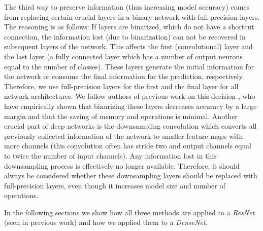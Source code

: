 \documentclass[10pt,twocolumn,letterpaper]{article}
\newcommand{\arch}[1]{\emph{#1}}
\begin{document}
The third way to preserve information (thus increasing model accuracy) comes from replacing certain crucial layers in a binary network with full precision layers.
The reasoning is as follows:
If layers are binarized, which do not have a shortcut connection, the information lost (due to binarization) can not be recovered in subsequent layers of the network.
This affects the first (convolutional) layer and the last layer (a fully connected layer which has a number of output neurons equal to the number of classes).
These layers generate the initial information for the network or consume the final information for the prediction, respectively.
Therefore, we use full-precision layers for the first and the final layer for all network architectures.
We follow authors of previous work on this decision \cite{Rastegari2016,Zhou2016}, who have empirically shown that binarizing these layers decreases accuracy by a large margin and that the saving of memory and operations is minimal.
Another crucial part of deep networks is the downsampling convolution which converts all previously collected information of the network to smaller feature maps with more channels (this convolution often has stride two and output channels equal to twice the number of input channels).
Any information lost in this downsampling process is effectively no longer available.
Therefore, it should always be considered whether these downsampling layers should be replaced with full-precision layers, even though it increases model size and number of operations.

In the following sections we show how all three methods are applied to a \arch{ResNet} (seen in previous work) and how we applied them to a \arch{DenseNet}. 
\end{document}
